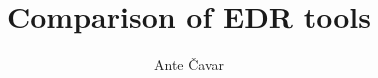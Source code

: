\documentclass[utf8, seminar]{fer}
\title{Comparison of EDR tools}
\author{Ante Čavar}
\renewcommand\thepage{}
\begin{document}
\maketitle
\newpage
\tableofcontents
\newpage
\mainmatter
% 
% 
% 
% 
% 
%


\begin{sazetak}

\end{sazetak}
\begin{kljucnerijeci}
\end{kljucnerijeci}
\newpage
\begin{abstract}
\end{abstract}
\begin{keywords}
\end{keywords}

\newpage
\end{document}
